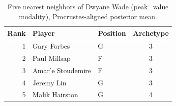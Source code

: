 \begin{table}[htbp]
  \centering\small
  \begin{tabular}{rllc}
    \toprule
    Rank & Player & Position & Archetype \\
    \midrule
    1 & Gary Forbes & G & 3 \\
    2 & Paul Millsap & F & 3 \\
    3 & Amar'e Stoudemire & F & 3 \\
    4 & Jeremy Lin & G & 3 \\
    5 & Malik Hairston & G & 4 \\
    \bottomrule
  \end{tabular}
  \caption{Five nearest neighbors of Dwyane Wade (peak_value modality), Procrustes-aligned posterior mean.}
  \label{tab:Dwyane_Wade_neighbors_peak_value}
\end{table}

